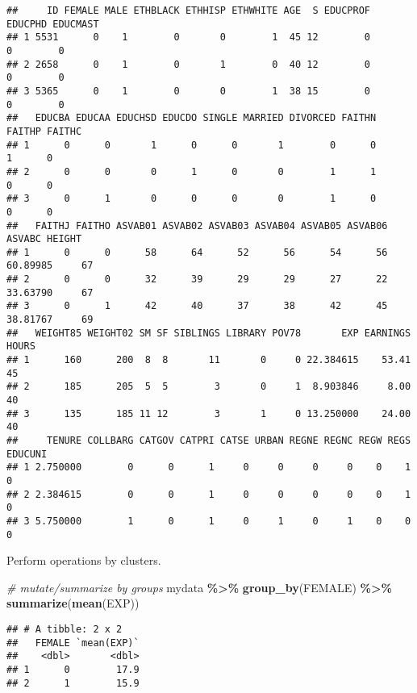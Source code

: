 \documentclass[
]{article}
\newenvironment{Shaded}{\begin{snugshade}}{\end{snugshade}}
\newcommand{\CommentTok}[1]{\textcolor[rgb]{0.56,0.35,0.01}{\textit{#1}}}
\newcommand{\FunctionTok}[1]{\textcolor[rgb]{0.13,0.29,0.53}{\textbf{#1}}}
\newcommand{\NormalTok}[1]{#1}
\newcommand{\SpecialCharTok}[1]{\textcolor[rgb]{0.81,0.36,0.00}{\textbf{#1}}}
\begin{document}
\begin{verbatim}
##     ID FEMALE MALE ETHBLACK ETHHISP ETHWHITE AGE  S EDUCPROF EDUCPHD EDUCMAST
## 1 5531      0    1        0       0        1  45 12        0       0        0
## 2 2658      0    1        0       1        0  40 12        0       0        0
## 3 5365      0    1        0       0        1  38 15        0       0        0
##   EDUCBA EDUCAA EDUCHSD EDUCDO SINGLE MARRIED DIVORCED FAITHN FAITHP FAITHC
## 1      0      0       1      0      0       1        0      0      1      0
## 2      0      0       0      1      0       0        1      1      0      0
## 3      0      1       0      0      0       0        1      0      0      0
##   FAITHJ FAITHO ASVAB01 ASVAB02 ASVAB03 ASVAB04 ASVAB05 ASVAB06   ASVABC HEIGHT
## 1      0      0      58      64      52      56      54      56 60.89985     67
## 2      0      0      32      39      29      29      27      22 33.63790     67
## 3      0      1      42      40      37      38      42      45 38.81767     69
##   WEIGHT85 WEIGHT02 SM SF SIBLINGS LIBRARY POV78       EXP EARNINGS HOURS
## 1      160      200  8  8       11       0     0 22.384615    53.41    45
## 2      185      205  5  5        3       0     1  8.903846     8.00    40
## 3      135      185 11 12        3       1     0 13.250000    24.00    40
##     TENURE COLLBARG CATGOV CATPRI CATSE URBAN REGNE REGNC REGW REGS EDUCUNI
## 1 2.750000        0      0      1     0     0     0     0    0    1       0
## 2 2.384615        0      0      1     0     0     0     0    0    1       0
## 3 5.750000        1      0      1     0     1     0     1    0    0       0
\end{verbatim}

Perform operations by clusters.

\begin{Shaded}
\begin{Highlighting}[]
\CommentTok{\# mutate/summarize by groups}
\NormalTok{mydata }\SpecialCharTok{\%\textgreater{}\%} 
  \FunctionTok{group\_by}\NormalTok{(FEMALE) }\SpecialCharTok{\%\textgreater{}\%}
  \FunctionTok{summarize}\NormalTok{(}\FunctionTok{mean}\NormalTok{(EXP))}
\end{Highlighting}
\end{Shaded}

\begin{verbatim}
## # A tibble: 2 x 2
##   FEMALE `mean(EXP)`
##    <dbl>       <dbl>
## 1      0        17.9
## 2      1        15.9
\end{verbatim}
\end{document}

